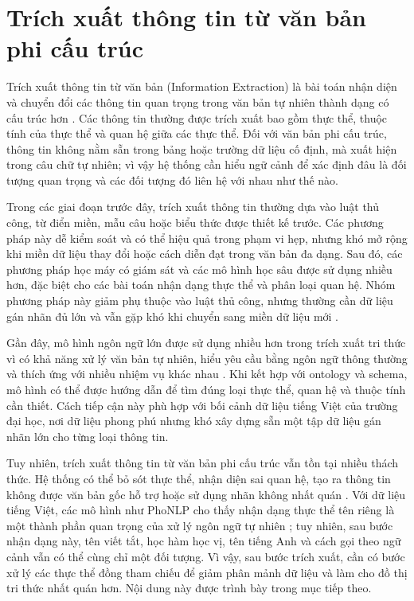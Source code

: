 \section{Trích xuất thông tin từ văn bản phi cấu trúc}

Trích xuất thông tin từ văn bản (Information Extraction) là bài toán nhận diện và chuyển đổi các thông tin quan trọng trong văn bản tự nhiên thành dạng có cấu trúc hơn \cite{ji2021survey}. Các thông tin thường được trích xuất bao gồm thực thể, thuộc tính của thực thể và quan hệ giữa các thực thể. Đối với văn bản phi cấu trúc, thông tin không nằm sẵn trong bảng hoặc trường dữ liệu cố định, mà xuất hiện trong câu chữ tự nhiên; vì vậy hệ thống cần hiểu ngữ cảnh để xác định đâu là đối tượng quan trọng và các đối tượng đó liên hệ với nhau như thế nào.

Trong các giai đoạn trước đây, trích xuất thông tin thường dựa vào luật thủ công, từ điển miền, mẫu câu hoặc biểu thức được thiết kế trước. Các phương pháp này dễ kiểm soát và có thể hiệu quả trong phạm vi hẹp, nhưng khó mở rộng khi miền dữ liệu thay đổi hoặc cách diễn đạt trong văn bản đa dạng. Sau đó, các phương pháp học máy có giám sát và các mô hình học sâu được sử dụng nhiều hơn, đặc biệt cho các bài toán nhận dạng thực thể và phân loại quan hệ. Nhóm phương pháp này giảm phụ thuộc vào luật thủ công, nhưng thường cần dữ liệu gán nhãn đủ lớn và vẫn gặp khó khi chuyển sang miền dữ liệu mới \cite{ji2021survey}.

Gần đây, mô hình ngôn ngữ lớn được sử dụng nhiều hơn trong trích xuất tri thức vì có khả năng xử lý văn bản tự nhiên, hiểu yêu cầu bằng ngôn ngữ thông thường và thích ứng với nhiều nhiệm vụ khác nhau \cite{pan2024unifying}. Khi kết hợp với ontology và schema, mô hình có thể được hướng dẫn để tìm đúng loại thực thể, quan hệ và thuộc tính cần thiết. Cách tiếp cận này phù hợp với bối cảnh dữ liệu tiếng Việt của trường đại học, nơi dữ liệu phong phú nhưng khó xây dựng sẵn một tập dữ liệu gán nhãn lớn cho từng loại thông tin.

Tuy nhiên, trích xuất thông tin từ văn bản phi cấu trúc vẫn tồn tại nhiều thách thức. Hệ thống có thể bỏ sót thực thể, nhận diện sai quan hệ, tạo ra thông tin không được văn bản gốc hỗ trợ hoặc sử dụng nhãn không nhất quán \cite{ji2023survey}. Với dữ liệu tiếng Việt, các mô hình như PhoNLP cho thấy nhận dạng thực thể tên riêng là một thành phần quan trọng của xử lý ngôn ngữ tự nhiên \cite{nguyen2021phonlp}; tuy nhiên, sau bước nhận dạng này, tên viết tắt, học hàm học vị, tên tiếng Anh và cách gọi theo ngữ cảnh vẫn có thể cùng chỉ một đối tượng. Vì vậy, sau bước trích xuất, cần có bước xử lý các thực thể đồng tham chiếu để giảm phân mảnh dữ liệu và làm cho đồ thị tri thức nhất quán hơn. Nội dung này được trình bày trong mục tiếp theo.

